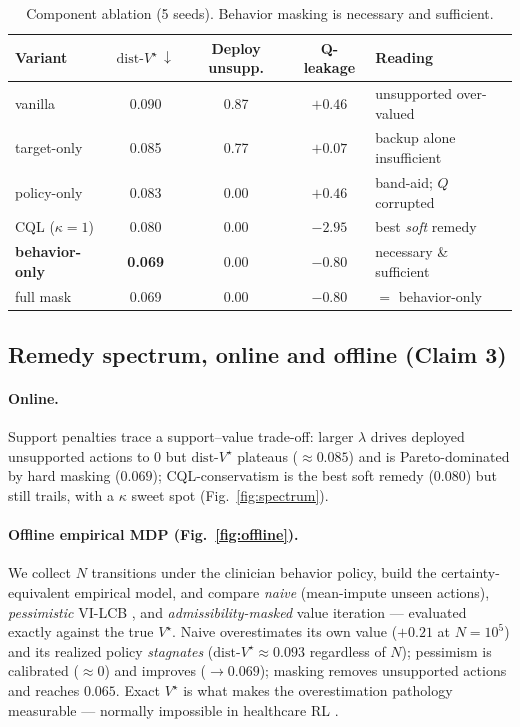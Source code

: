 \documentclass{article}
\newcommand{\dist}{\mathrm{dist}\text{-}V^\star}
\begin{document}
\begin{table}[t]
\centering
\caption{Component ablation (5 seeds). Behavior masking is necessary and sufficient.}
\label{tab:ablation}
\begin{tabular}{lcccl}
\toprule
Variant & $\dist\,\downarrow$ & Deploy unsupp. & Q-leakage & Reading \\
\midrule
vanilla            & 0.090 & 0.87 & $+0.46$ & unsupported over-valued \\
target-only        & 0.085 & 0.77 & $+0.07$ & backup alone insufficient \\
policy-only        & 0.083 & 0.00 & $+0.46$ & band-aid; $Q$ corrupted \\
CQL ($\kappa{=}1$) & 0.080 & 0.00 & $-2.95$ & best \emph{soft} remedy \\
\textbf{behavior-only} & \textbf{0.069} & 0.00 & $-0.80$ & necessary \& sufficient \\
full mask          & 0.069 & 0.00 & $-0.80$ & $=$ behavior-only \\
\bottomrule
\end{tabular}
\end{table}

\subsection{Remedy spectrum, online and offline (Claim 3)}
\label{sec:remedy}
\paragraph{Online.} Support penalties trace a support--value trade-off: larger
$\lambda$ drives deployed unsupported actions to $0$ but $\dist$ plateaus
($\approx 0.085$) and is Pareto-dominated by hard masking ($0.069$);
CQL-conservatism is the best soft remedy ($0.080$) but still trails, with a
$\kappa$ sweet spot (Fig.~\ref{fig:spectrum}).

\paragraph{Offline empirical MDP (Fig.~\ref{fig:offline}).} We collect $N$
transitions under the clinician behavior policy, build the certainty-equivalent
empirical model, and compare \emph{naive} (mean-impute unseen actions),
\emph{pessimistic} VI-LCB \citep{jin2021pessimism,rashidinejad2021pessimism}, and
\emph{admissibility-masked} value iteration --- evaluated exactly against the true
$V^\star$. Naive overestimates its own value ($+0.21$ at $N{=}10^5$) and its
realized policy \emph{stagnates} ($\dist\approx0.093$ regardless of $N$);
pessimism is calibrated ($\approx0$) and improves ($\to0.069$); masking removes
unsupported actions and reaches $0.065$. Exact $V^\star$ is what makes the
overestimation pathology measurable --- normally impossible in healthcare RL
\citep{gottesman2019guidelines}.
\end{document}
